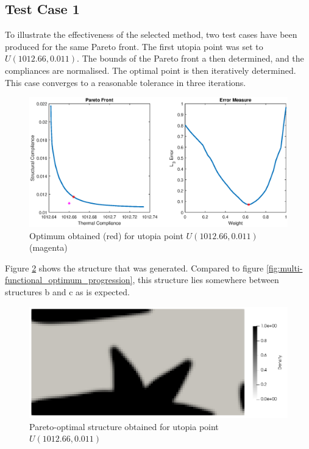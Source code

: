 \subsection*{Test Case 1}
To illustrate the effectiveness of the selected method, two test cases have been produced for the same Pareto front. The first utopia point was set to $U(1012.66, 0.011)$. The bounds of the Pareto front a then determined, and the compliances are normalised. The optimal point is then iteratively determined. This case converges to a reasonable tolerance in three iterations.
\begin{figure}[ht]
    \centering
    \includegraphics[width=0.8\linewidth]{figures/chapter_5/ParetoOpt_w0063.eps}
    \caption{Optimum obtained (red) for utopia point $U(1012.66, 0.011)$ (magenta)}
    \label{fig:utopia_66_011}
\end{figure}

Figure \ref{fig:optimal_structure_1} shows the structure that was generated. Compared to figure \ref{fig:multi-functional_optimum_progression}, this structure lies somewhere between structures b and c as is expected. 
\begin{figure}[ht]
    \centering
    \includegraphics[width=0.7\linewidth]{figures/chapter_5/ParetoOptimuim_Test1.png}
    \caption{Pareto-optimal structure obtained for utopia point $U(1012.66, 0.011)$}
    \label{fig:optimal_structure_1}
\end{figure}


